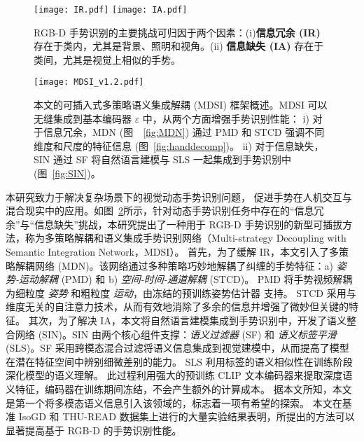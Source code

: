 \begin{figure}[tb]
\centering
{}
{\texttt{[image: IR.pdf]}}
{\texttt{[image: IA.pdf]}}
\caption{RGB-D 手势识别的主要挑战可归因于两个因素：(i)\textbf{信息冗余 (IR)} 存在于类内，尤其是背景、照明和视角。(ii) \textbf{信息缺失 (IA)} 存在于类间，尤其是视觉上相似的手势。}
\label{fig:samples}
\end{figure}


\begin{figure}[tb]
\centering
\texttt{[image: MDSI\_v1.2.pdf]}%
\caption{本文的可插入式多策略语义集成解耦 (MDSI) 框架概述。MDSI 可以无缝集成到基本编码器 $\varepsilon$ 中，从两个方面增强手势识别性能：
i) 对于信息冗余，MDN (图~~\ref{fig:MDN}) 通过 PMD 和 STCD 强调不同维度和尺度的特征信息 (图~\ref{fig:handdecomp})。
ii) 对于信息缺失，SIN 通过 SF 将自然语言建模与 SLS 一起集成到手势识别中 (图~\ref{fig:SIN})。}
\label{fig:MDSI}
\end{figure}

本研究致力于解决复杂场景下的视觉动态手势识别问题，
促进手势在人机交互与混合现实中的应用。如图~\ref{fig:MDSI}所示，针对动态手势识别任务中存在的“信息冗余”与“信息缺失”挑战，本研究提出了一种用于 RGB-D 手势识别的新型可插拔方法，称为多策略解耦和语义集成手势识别网络（Multi-strategy Decoupling with Semantic Integration Network，MDSI）。
首先，为了缓解 IR，本文引入了多策略解耦网络 (MDN)。该网络通过多种策略巧妙地解耦了纠缠的手势特征：a) \emph{姿势-运动解耦} (PMD) 和 b) \emph{空间-时间-通道解耦} (STCD)。
PMD 将手势视频解耦为细粒度 \emph{姿势} 和粗粒度 \emph{运动}，由冻结的预训练姿势估计器 \cite{sun2019deep} 支持。
STCD 采用与维度无关的自注意力技术，从而有效地消除了多余的信息并增强了微妙但关键的特征。
其次，为了解决 IA，本文将自然语言建模集成到手势识别中，开发了语义整合网络 (SIN)。SIN 由两个核心组件支撑：\emph{语义过滤器} (SF) 和 \emph{语义标签平滑} (SLS)。SF 采用跨模态混合过滤将语义信息集成到视觉建模中，从而提高了模型在潜在特征空间中辨别细微差别的能力。
SLS 利用标签的语义相似性在训练阶段深化模型的语义理解。
此过程利用强大的预训练 CLIP 文本编码器来提取深度语义特征，编码器在训练期间冻结，不会产生额外的计算成本。
据本文所知，本文是第一个将多模态语义信息引入该领域的，标志着一项有希望的探索。
本文在基准 IsoGD 和 THU-READ 数据集上进行的大量实验结果表明，所提出的方法可以显著提高基于 RGB-D 的手势识别性能。

